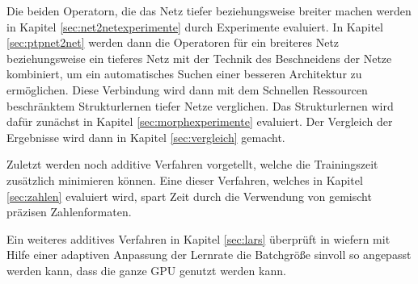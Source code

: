 Die beiden Operatorn, die das Netz tiefer beziehungsweise breiter machen werden in Kapitel \ref{sec:net2netexperimente} durch Experimente evaluiert. In Kapitel \ref{sec:ptpnet2net} werden dann die Operatoren für ein breiteres Netz beziehungsweise ein tieferes Netz mit der Technik des Beschneidens der Netze kombiniert, um ein automatisches Suchen einer besseren Architektur zu ermöglichen. Diese Verbindung wird dann mit dem Schnellen Ressourcen beschränktem Strukturlernen tiefer Netze verglichen. Das Strukturlernen wird dafür zunächst in Kapitel \ref{sec:morphexperimente} evaluiert. Der Vergleich der Ergebnisse wird dann in Kapitel \ref{sec:vergleich} gemacht.


Zuletzt werden noch additive Verfahren vorgetellt, welche die Trainingszeit zusätzlich minimieren können.
Eine dieser Verfahren, welches in Kapitel \ref{sec:zahlen} evaluiert wird, spart Zeit durch die Verwendung von gemischt präzisen Zahlenformaten.

Ein weiteres additives Verfahren in Kapitel \ref{sec:lars} überprüft in wiefern mit Hilfe einer adaptiven Anpassung der Lernrate die Batchgröße sinvoll so angepasst werden kann, dass die ganze GPU genutzt werden kann.


\color{black}
